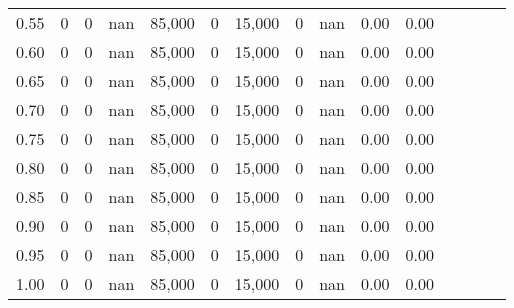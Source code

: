 \begin{tabular}{rrrcrrrrrrrrrrr}
0.55 &       0 &      0 &                                        nan &  85,000 &       0 &  15,000 &       0 &   nan &  0.00 &                         0.00 \\
0.60 &       0 &      0 &                                        nan &  85,000 &       0 &  15,000 &       0 &   nan &  0.00 &                         0.00 \\
0.65 &       0 &      0 &                                        nan &  85,000 &       0 &  15,000 &       0 &   nan &  0.00 &                         0.00 \\
0.70 &       0 &      0 &                                        nan &  85,000 &       0 &  15,000 &       0 &   nan &  0.00 &                         0.00 \\
0.75 &       0 &      0 &                                        nan &  85,000 &       0 &  15,000 &       0 &   nan &  0.00 &                         0.00 \\
0.80 &       0 &      0 &                                        nan &  85,000 &       0 &  15,000 &       0 &   nan &  0.00 &                         0.00 \\
0.85 &       0 &      0 &                                        nan &  85,000 &       0 &  15,000 &       0 &   nan &  0.00 &                         0.00 \\
0.90 &       0 &      0 &                                        nan &  85,000 &       0 &  15,000 &       0 &   nan &  0.00 &                         0.00 \\
0.95 &       0 &      0 &                                        nan &  85,000 &       0 &  15,000 &       0 &   nan &  0.00 &                         0.00 \\
1.00 &       0 &      0 &                                        nan &  85,000 &       0 &  15,000 &       0 &   nan &  0.00 &                         0.00 \\
\bottomrule
\end{tabular}
